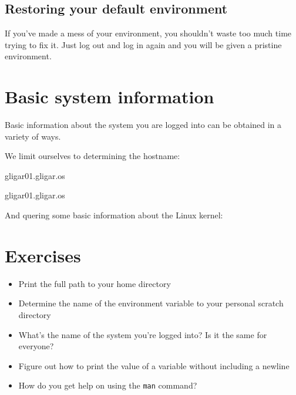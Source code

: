 \subsection{Restoring your default environment}

If you've made a mess of your environment, you shouldn't waste too much time
trying to fix it. Just log out and log in again and you will be given a
pristine environment.

\section{Basic system information}

Basic information about the system you are logged into can be obtained in a variety of ways.

We limit ourselves to determining the hostname:

\begin{prompt}
  gligar01.gligar.os

  gligar01.gligar.os
\end{prompt}

And quering some basic information about the Linux kernel:


\section{Exercises}

\begin{itemize}
    \item Print the full path to your home directory
    \item Determine the name of the environment variable to your personal scratch directory
    \item What's the name of the system you're logged into? Is it the same for everyone?
    \item Figure out how to print the value of a variable without including a newline
    \item How do you get help on using the \lstinline|man| command?
\end{itemize}
